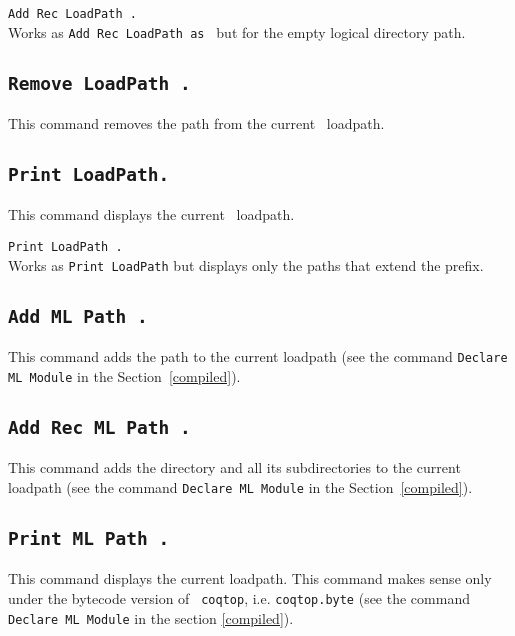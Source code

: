 \begin{Variants}
\item {\tt Add Rec LoadPath {\str}.}\\
Works as {\tt Add Rec LoadPath {\str} as {\dirpath}} but for the empty logical directory path.
\end{Variants}

\subsection[\tt Remove LoadPath {\str}.]{\tt Remove LoadPath {\str}.}
This command removes the path {\str} from the current \Coq\ loadpath.

\subsection[\tt Print LoadPath.]{\tt Print LoadPath.}
This command displays the current \Coq\ loadpath.

\begin{Variants}
\item {\tt Print LoadPath {\dirpath}.}\\
Works as {\tt Print LoadPath} but displays only the paths that extend the {\dirpath} prefix.
\end{Variants}

\subsection[\tt Add ML Path {\str}.]{\tt Add ML Path {\str}.}
This command adds the path {\str} to the current {\ocaml} loadpath (see
the command {\tt Declare ML Module} in the Section~\ref{compiled}).

\subsection[\tt Add Rec ML Path {\str}.]{\tt Add Rec ML Path {\str}.}
This command adds the directory {\str} and all its subdirectories
to the current {\ocaml} loadpath (see
the command {\tt Declare ML Module} in the Section~\ref{compiled}).

\subsection[\tt Print ML Path {\str}.]{\tt Print ML Path {\str}.}
This command displays the current {\ocaml} loadpath.
This command makes sense only under the bytecode version of {\tt
coqtop}, i.e. {\tt coqtop.byte} (see the
command {\tt Declare ML Module} in the section
\ref{compiled}).

